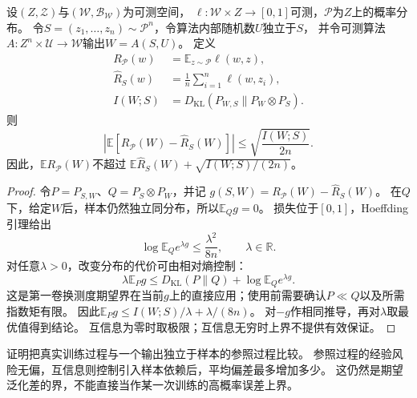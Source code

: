 \begin{theorem}[互信息与期望风险]
\label{thm:mutual-information-risk}
设$(Z,\mathcal Z)$与$(\mathcal W,\mathcal B_{\mathcal W})$为可测空间，
$\ell:\mathcal W\times Z\to[0,1]$可测，$\mathcal P$为$Z$上的概率分布。
令$S=(z_1,\ldots,z_n)\sim\mathcal P^n$，令算法内部随机数$U$独立于$S$，
并令可测算法$A:Z^n\times\mathcal U\to\mathcal W$输出$W=A(S,U)$。
定义
\[
\begin{aligned}
 R_{\mathcal P}(w)
 &=\mathbb E_{z\sim\mathcal P}\ell(w,z),\\
 \hat R_S(w)
 &=\frac1n\sum_{i=1}^n\ell(w,z_i),\\
 I(W;S)
 &=D_{\mathrm{KL}}(P_{W,S}\|P_W\otimes P_S).
\end{aligned}
\]
则
\begin{equation}
 \left|\mathbb E[R_{\mathcal P}(W)-\hat R_S(W)]\right|
 \leq\sqrt{\frac{I(W;S)}{2n}}.
 \label{eq:mutual-information-generalization}
\end{equation}
因此，$\mathbb E R_{\mathcal P}(W)$不超过
$\mathbb E\hat R_S(W)+\sqrt{I(W;S)/(2n)}$。
\end{theorem}
\begin{proof}
令$P=P_{S,W}$、$Q=P_S\otimes P_W$，并记
$g(S,W)=R_{\mathcal P}(W)-\hat R_S(W)$。
在$Q$下，给定$W$后，样本仍然独立同分布，所以$\mathbb E_Qg=0$。
损失位于$[0,1]$，Hoeffding引理给出
\[
 \log\mathbb E_Q e^{\lambda g}\leq\frac{\lambda^2}{8n},
 \qquad \lambda\in\mathbb R.
\]
对任意$\lambda>0$，改变分布的代价可由相对熵控制：
\begin{equation}
 \lambda\mathbb E_Pg
 \leq D_{\mathrm{KL}}(P\|Q)+\log\mathbb E_Q e^{\lambda g}.
 \label{eq:information-change-measure}
\end{equation}
这是第一卷换测度期望界在当前$g$上的直接应用；使用前需要确认$P\ll Q$以及所需
指数矩有限。
因此$\mathbb E_Pg\leq I(W;S)/\lambda+\lambda/(8n)$。
对$-g$作相同推导，再对$\lambda$取最优值得到结论。
互信息为零时取极限；互信息无穷时上界不提供有效保证。
\end{proof}

证明把真实训练过程与一个输出独立于样本的参照过程比较。
参照过程的经验风险无偏，互信息则控制引入样本依赖后，平均偏差最多增加多少。
这仍然是期望泛化差的界，不能直接当作某一次训练的高概率误差上界。

